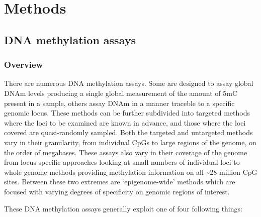 \documentclass[
]{book}
\begin{document}
\hypertarget{methods}{%
\chapter{Methods}\label{methods}}

\hypertarget{dna-methylation-assays-1}{%
\section{DNA methylation assays}\label{dna-methylation-assays-1}}

\hypertarget{overview}{%
\subsection{Overview}\label{overview}}

There are numerous DNA methylation assays. Some are designed to assay global DNAm levels producing a single global measurement of the amount of 5mC present in a sample, others assay DNAm in a manner traceble to a specific genomic locus. These methods can be further subdivided into targeted methods where the loci to be examined are known in advance, and those where the loci covered are quasi-randomly sampled. Both the targeted and untargeted methods vary in their granularity, from individual CpGs to large regions of the genome, on the order of megabases. These assays also vary in their coverage of the genome from locus-specific approaches looking at small numbers of individual loci to whole genome methods providing methylation information on all \textasciitilde28 million CpG sites. Between these two extremes are `epigenome-wide' methods which are focused with varying degrees of specificity on genomic regions of interest.

These DNA methylation assays generally exploit one of four following things:
\end{document}
